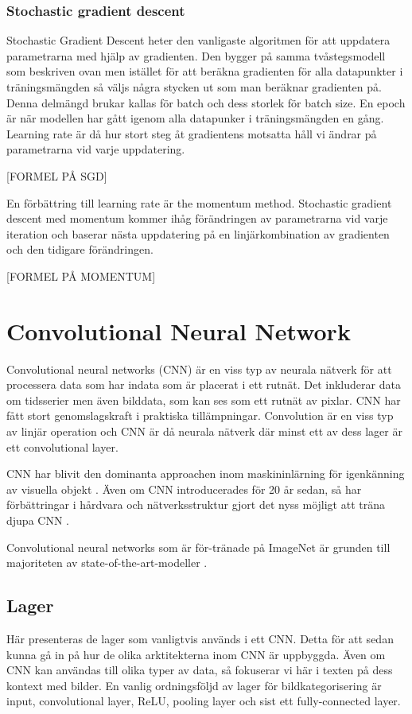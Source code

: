 \documentclass[]{kththesis}
\begin{document}
\subsubsection{Stochastic gradient descent}
Stochastic Gradient Descent heter den vanligaste algoritmen för att uppdatera parametrarna med hjälp av gradienten. Den bygger på samma tvåstegsmodell som beskriven ovan men istället för att beräkna gradienten för alla datapunkter i träningsmängden så väljs några stycken ut som man beräknar gradienten på. Denna delmängd brukar kallas för batch och dess storlek för batch size. En epoch är när modellen har gått igenom alla datapunker i träningsmängden en gång. Learning rate är då hur stort steg åt gradientens motsatta håll vi ändrar på parametrarna vid varje uppdatering.

[FORMEL PÅ SGD]

En förbättring till learning rate är the momentum method. Stochastic gradient descent med momentum kommer ihåg förändringen av parametrarna vid varje iteration och baserar nästa uppdatering på en linjärkombination av gradienten och den tidigare förändringen. 

[FORMEL PÅ MOMENTUM]

\section{Convolutional Neural Network}
Convolutional neural networks (CNN) är en viss typ av neurala nätverk för att processera data som har indata som är placerat i ett rutnät. Det inkluderar data om tidsserier men även bilddata, som kan ses som ett rutnät av pixlar. CNN har fått stort genomslagskraft i praktiska tillämpningar. Convolution är en viss typ av linjär operation och CNN är då neurala nätverk där minst ett av dess lager är ett convolutional layer.

CNN har blivit den dominanta approachen inom maskininlärning för igenkänning av visuella objekt \parencite{huang2017densely}. Även om CNN introducerades för 20 år sedan, så har förbättringar i hårdvara och nätverksstruktur gjort det nyss möjligt att träna djupa CNN \parencite{huang2017densely}.

Convolutional neural networks som är för-tränade på ImageNet är grunden till majoriteten av state-of-the-art-modeller \parencite{simon2016imagenet}.

\subsection{Lager}
Här presenteras de lager som vanligtvis används i ett CNN. Detta för att sedan kunna gå in på hur de olika arktitekterna inom CNN är uppbyggda. Även om CNN kan användas till olika typer av data, så fokuserar vi här i texten på dess kontext med bilder. En vanlig ordningsföljd av lager för bildkategorisering är input, convolutional layer, ReLU, pooling layer och sist ett fully-connected layer.
\end{document}
